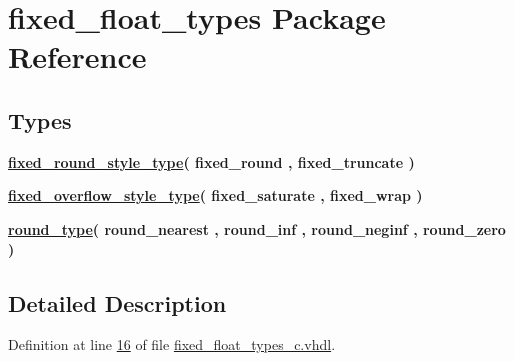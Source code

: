 \hypertarget{classfixed__float__types}{}\section{fixed\+\_\+float\+\_\+types Package Reference}
\label{classfixed__float__types}
\subsection*{Types}
 \begin{DoxyCompactItemize}
\item 
{\bfseries \hyperlink{classfixed__float__types_a531b370a8acfecdccebf696cf0d2d971}{fixed\+\_\+round\+\_\+style\+\_\+type}{\bfseries \textcolor{vhdlchar}{(}\textcolor{vhdlchar}{ }\textcolor{vhdlchar}{fixed\+\_\+round}\textcolor{vhdlchar}{ }\textcolor{vhdlchar}{,}\textcolor{vhdlchar}{ }\textcolor{vhdlchar}{fixed\+\_\+truncate}\textcolor{vhdlchar}{ }\textcolor{vhdlchar}{)}\textcolor{vhdlchar}{ }}} 
\item 
{\bfseries \hyperlink{classfixed__float__types_a8a8b6b0022e693377949251b05ac846a}{fixed\+\_\+overflow\+\_\+style\+\_\+type}{\bfseries \textcolor{vhdlchar}{(}\textcolor{vhdlchar}{ }\textcolor{vhdlchar}{fixed\+\_\+saturate}\textcolor{vhdlchar}{ }\textcolor{vhdlchar}{,}\textcolor{vhdlchar}{ }\textcolor{vhdlchar}{fixed\+\_\+wrap}\textcolor{vhdlchar}{ }\textcolor{vhdlchar}{)}\textcolor{vhdlchar}{ }}} 
\item 
{\bfseries \hyperlink{classfixed__float__types_a3cab38cfb8c7d6b81f4f0b9953cd212f}{round\+\_\+type}{\bfseries \textcolor{vhdlchar}{(}\textcolor{vhdlchar}{ }\textcolor{vhdlchar}{round\+\_\+nearest}\textcolor{vhdlchar}{ }\textcolor{vhdlchar}{,}\textcolor{vhdlchar}{ }\textcolor{vhdlchar}{round\+\_\+inf}\textcolor{vhdlchar}{ }\textcolor{vhdlchar}{,}\textcolor{vhdlchar}{ }\textcolor{vhdlchar}{round\+\_\+neginf}\textcolor{vhdlchar}{ }\textcolor{vhdlchar}{,}\textcolor{vhdlchar}{ }\textcolor{vhdlchar}{round\+\_\+zero}\textcolor{vhdlchar}{ }\textcolor{vhdlchar}{)}\textcolor{vhdlchar}{ }}} 
\end{DoxyCompactItemize}


\subsection{Detailed Description}


Definition at line \hyperlink{fixed__float__types__c_8vhdl_source_l00016}{16} of file \hyperlink{fixed__float__types__c_8vhdl_source}{fixed\+\_\+float\+\_\+types\+\_\+c.\+vhdl}.



